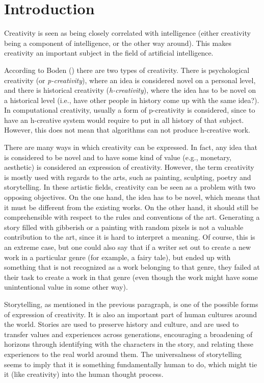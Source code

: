 \section{Introduction}

Creativity is seen as being closely correlated with intelligence (either
creativity being a component of intelligence, or the other way around).
This makes creativity an important subject in the field of artificial
intelligence.

According to Boden (\cite{Boden1998347})
there are two types of creativity. There is psychological creativity (or
\emph{p-creativity}), where an idea is considered novel on a personal level, and
there is historical creativity (\emph{h-creativity}), where the idea has to be
novel on a historical level (i.e., have other people in history come up with the
same idea?).
In computational creativity, usually a form of p-creativity is considered, since
to have an h-creative system would require to put in all history of that
subject. However, this does not mean that algorithms can not produce h-creative
work.

There are many ways in which creativity can be expressed. In fact, any idea that
is considered to be novel and to have some kind of value (e.g., monetary, aesthetic) is
considered an expression of creativity. However, the term creativity is mostly used with regards to
the arts, such as painting, sculpting, poetry and storytelling. In these
artistic fields, creativity can be seen as a problem with two opposing
objectives. On the one hand, the idea has to be novel, which means that it must be different from
the existing works. On the other hand, it should still be comprehensible with
respect to the rules and conventions of the art. Generating a story filled with
gibberish or a painting with random pixels is not a valuable contribution to the
art, since it is hard to interpret a meaning. Of course, this is an extreme
case, but one could also say that if a writer set out to create a new work in a
particular genre (for example, a fairy tale), but ended up with something that
is not recognized as a work belonging to that genre, they failed at their task to
create a work in that genre (even though the work might have some unintentional
value in some other way).

Storytelling, as mentioned in the previous paragraph, is one of the possible
forms of expression of creativity. It is also an important part of human cultures around the world.
Stories are used to preserve history and culture, and are used to transfer values
and experiences across generations, encouraging a broadening of horizons through
identifying with the characters in the story, and relating these experiences to
the real world around them. The universalness of storytelling seems to imply
that it is something fundamentally human to do, which might tie it (like
creativity) into the human thought process.

